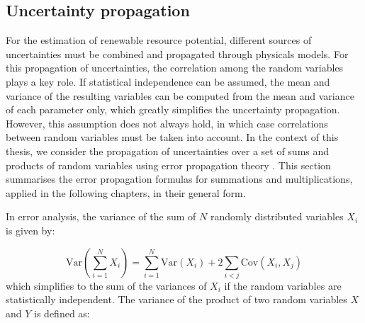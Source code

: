 \subsection{Uncertainty propagation}
\label{method_unc_prop}

For the estimation of renewable resource potential, different sources of uncertainties must be combined and propagated through physicals models. 
For this propagation of uncertainties, the correlation among the random variables plays a key role.
%
If statistical independence can be assumed, the mean and variance of the resulting variables can be computed from the mean and variance of each parameter only, which greatly simplifies the uncertainty propagation.
However, this assumption does not always hold, in which case correlations between random variables must be taken into account.
In the context of this thesis, we consider the propagation of uncertainties over a set of sums and products of random variables using error propagation theory \cite{jcgm_evaluation_2008, goodman_variance_1962}. This section summarises the error propagation formulas for summations and multiplications, applied in the following chapters, in their general form.

In error analysis, the variance of the sum of $N$ randomly distributed variables $X_i$ is given by:

\begin{equation}
\label{eq:unc_sum}
\mathrm{Var}\left(\sum_{i=1}^N X_i\right) = \sum_{i=1}^N\mathrm{Var}(X_i) + 2\sum_{i < j}\mathrm{Cov}(X_i, X_j)
\end{equation}
which simplifies to the sum of the variances of $X_i$ if the random variables are statistically independent.
%
The variance of the product of two random variables $X$ and $Y$ is defined as:

